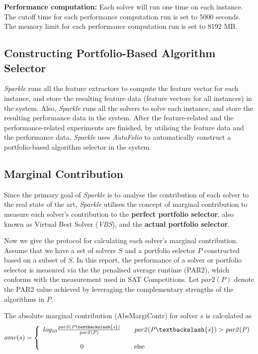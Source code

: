 \documentclass[british]{article}
\begin{document}
\textbf{Performance computation:} Each solver will run one time on each instance. The cutoff time for each performance computation run is set to 5000 seconds. The memory limit for each performance computation run is set to 8192 MB.

\subsection{Constructing Portfolio-Based Algorithm Selector}
\label{sec:Portfolio}

\emph{Sparkle} runs all the feature extractors to compute the feature vector for each instance, and store the resulting feature data (feature vectors for all instances) in the system. Also, \emph{Sparkle} runs all the solvers to solve each instance, and store the resulting performance data in the system. After the feature-related and the performance-related experiments are finished, by utilising the feature data and the performance data, \emph{Sparkle} uses \emph{AutoFolio} \cite{LinEtAl15} to automatically construct a portfolio-based algorithm selector in the system.

\subsection{Marginal Contribution}
\label{sec:Marginal_Contribution}

Since the primary goal of \emph{Sparkle} is to analyse the contribution of each solver to the real state of the art, \emph{Sparkle} utilises the concept of marginal contribution \cite{XuEtAl12} to measure each solver's contribution to the \textbf{perfect portfolio selector}, also known as Virtual Best Solver (\emph{VBS}), and the \textbf{actual portfolio selector}.

Now we give the protocol for calculating each solver's marginal contribution. Assume that we have a set of solvers $S$ and a portfolio selector $P$ constructed based on a subset of $S$. In this report, the performance of a solver or portfolio selector is measured via the the penalised average runtime (PAR2), which conforms with the measurement used in SAT Competitions. Let $\mathit{par2(P)}$ denote the PAR2 value achieved by leveraging the complementary strengths of the algorithms in $P$.

The absolute marginal contribution (Abs\textunderscore Margi\textunderscore Contr) for solver $s$ is calculated as 
\begin{equation}
amc(s)=\left\{
\begin{array}{ccl}
log_{10}{\frac{\mathit{par2(P\textbackslash \{s\})}}{\mathit{par2(P)}}} & & \mathit{par2(P\textbackslash \{s\})}> \mathit{par2(P)} \\
& & \\
0 & & \text{else}
\end{array} \right.
\end{equation}
\end{document}
